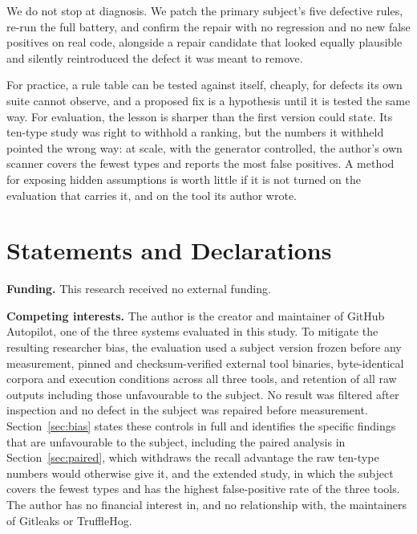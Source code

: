 \documentclass[pdflatex,sn-basic]{sn-jnl}
\begin{document}
We do not stop at diagnosis. We patch the primary subject's five defective rules, re-run the full battery, and confirm the repair with no regression and no new false positives on real code, alongside a repair candidate that looked equally plausible and silently reintroduced the defect it was meant to remove.

For practice, a rule table can be tested against itself, cheaply, for defects its own suite cannot observe, and a proposed fix is a hypothesis until it is tested the same way. For evaluation, the lesson is sharper than the first version could state. Its ten-type study was right to withhold a ranking, but the numbers it withheld pointed the wrong way: at scale, with the generator controlled, the author's own scanner covers the fewest types and reports the most false positives. A method for exposing hidden assumptions is worth little if it is not turned on the evaluation that carries it, and on the tool its author wrote.

\backmatter

\section*{Statements and Declarations}

\textbf{Funding.} This research received no external funding.

\textbf{Competing interests.} The author is the creator and maintainer of GitHub Autopilot, one of the three systems evaluated in this study. To mitigate the resulting researcher bias, the evaluation used a subject version frozen before any measurement, pinned and checksum-verified external tool binaries, byte-identical corpora and execution conditions across all three tools, and retention of all raw outputs including those unfavourable to the subject. No result was filtered after inspection and no defect in the subject was repaired before measurement. Section~\ref{sec:bias} states these controls in full and identifies the specific findings that are unfavourable to the subject, including the paired analysis in Section~\ref{sec:paired}, which withdraws the recall advantage the raw ten-type numbers would otherwise give it, and the extended study, in which the subject covers the fewest types and has the highest false-positive rate of the three tools. The author has no financial interest in, and no relationship with, the maintainers of Gitleaks or TruffleHog.
\end{document}
